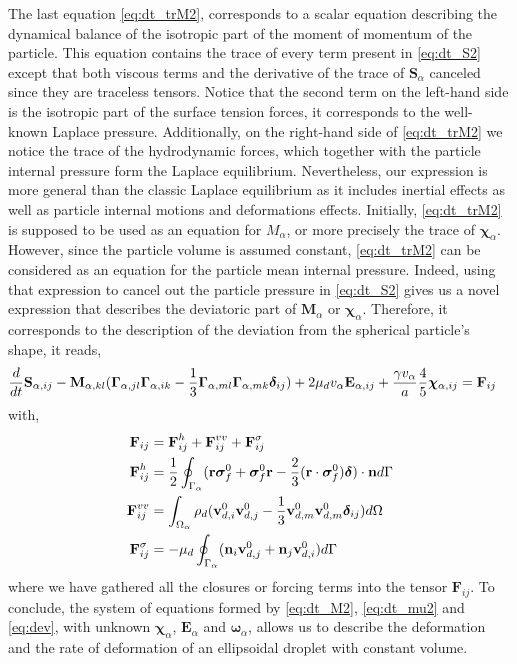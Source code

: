 The last equation \eqref{eq:dt_trM2}, corresponds to a scalar equation describing the dynamical balance of the isotropic part of the moment of momentum of the particle. 
This equation contains the trace of every term present in \ref{eq:dt_S2} except that both viscous terms and the derivative of the trace of $\textbf{S}_\alpha$ canceled since they are traceless tensors. 
Notice that the second term on the left-hand side is the isotropic part of the surface tension forces, it corresponds to the well-known Laplace pressure. 
Additionally, on the right-hand side of \ref{eq:dt_trM2} we notice the trace of the hydrodynamic forces, which together with the particle internal pressure form the Laplace equilibrium. 
Nevertheless, our expression is more general than the classic Laplace equilibrium as it includes inertial effects as well as particle internal motions and deformations effects.  
Initially, \ref{eq:dt_trM2} is supposed to be used as an equation for $M_\alpha$, or more precisely the trace of $\bm\chi_\alpha$.
However, since the particle volume is assumed constant, \ref{eq:dt_trM2} can be considered as an equation for the particle mean internal pressure. 
Indeed, using that expression to cancel out the particle pressure in \ref{eq:dt_S2} gives us a novel expression that describes the deviatoric part of $\textbf{M}_\alpha$ or $\bm\chi_\alpha$.
Therefore, it corresponds to the description of the deviation from the spherical particle's shape, it reads, 
\begin{align}
    \ddt \textbf{S}_{\alpha,ij}
    -   \textbf{M}_{\alpha,kl} 
    (\bm\Gamma_{\alpha,jl}\bm\Gamma_{\alpha,ik}  
    - \frac{1}{3}
    \bm\Gamma_{\alpha,ml}\bm\Gamma_{\alpha,mk}  
    \bm\delta_{ij}
    )
    &+ 2 \mu_d v_\alpha \textbf{E}_{\alpha,ij}
    + \frac{\gamma v_\alpha }{a} 
    \frac{4  }{5} \bm\chi_{\alpha,ij}
    = \textbf{F}_{ij}
    \label{eq:dev}
\end{align}
with,
\begin{align}
    \textbf{F}_{ij}
    &= 
    \textbf{F}_{ij}^h
    +\textbf{F}_{ij}^{vv}
    + \textbf{F}_{ij}^{\sigma}\\
    \textbf{F}_{ij}^h
    &= \frac{1}{2}\oint_{\Gamma_{\alpha}} (\textbf{r}\bm\sigma_f^0 + \bm\sigma_f^0\textbf{r} - \frac{2}{3}(\textbf{r}\cdot \bm\sigma_f^0) \bm\delta)\cdot \textbf{n} d\Gamma \\
    \textbf{F}_{ij}^{vv}
    &= \int_{\Omega_{\alpha}} \rho_d (\textbf{v}_{d,i}^0\textbf{v}_{d,j}^0 - \frac{1}{3}\textbf{v}_{d,m}^0\textbf{v}_{d,m}^0 \bm\delta_{ij})  d\Omega\\
    \textbf{F}_{ij}^{\sigma}
    &= - \mu_d \oint_{\Gamma_{\alpha}} (\textbf{n}_i \textbf{v}_{d,j}^0 + \textbf{n}_j \textbf{v}_{d,i}^0) d\Gamma\nonumber
\end{align}
where we have gathered all the closures or forcing terms into the tensor $\textbf{F}_{ij}$. 
To conclude, the system of equations formed by \ref{eq:dt_M2}, \ref{eq:dt_mu2} and \ref{eq:dev}, with unknown $\bm\chi_\alpha$, $\textbf{E}_\alpha$ and $\bm\omega_\alpha$, allows us to describe the deformation and the rate of deformation of an ellipsoidal droplet with constant volume.

